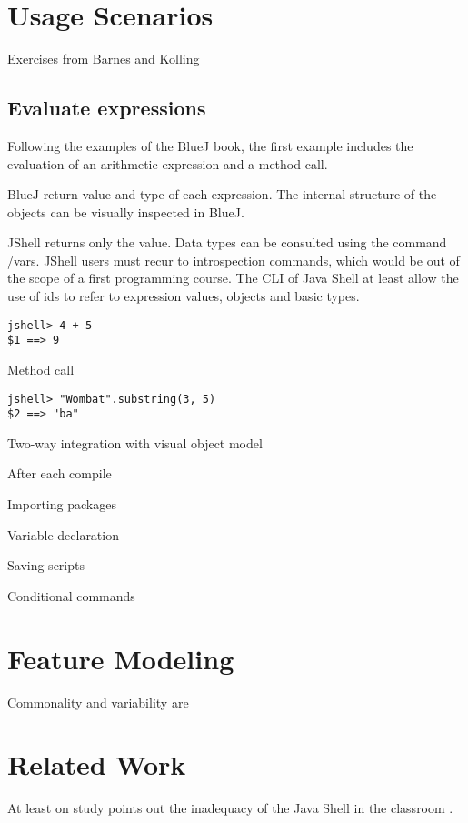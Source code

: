 \documentclass{article}
\begin{document}
\section{Usage Scenarios}

Exercises from Barnes and Kolling

\subsection{Evaluate expressions}

Following the examples of the BlueJ book, the first example includes the evaluation of an arithmetic expression and a method call.

BlueJ return value and type of each expression. 
The internal structure of the objects can be visually inspected in BlueJ. 

JShell returns only the value. Data types can be consulted using the command /vars.
JShell users must recur to introspection commands, which would be out of the scope of a first programming course. 
The CLI of Java Shell at least allow the use of ids to refer to expression values,  objects  and basic types.

\begin{lstlisting}
jshell> 4 + 5
$1 ==> 9
\end{lstlisting}

Method call
\begin{lstlisting}
jshell> "Wombat".substring(3, 5)
$2 ==> "ba"
\end{lstlisting}
Two-way integration with visual object model

After each compile

Importing packages

Variable declaration

Saving scripts

Conditional commands


\section{Feature Modeling}
Commonality and variability are

\section{Related Work}

At least on study points out the inadequacy of the Java Shell in the classroom
\cite{politz_minnes2018jshell}.
\end{document}
